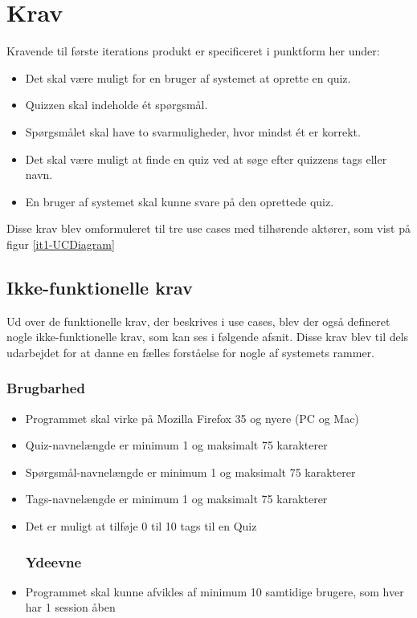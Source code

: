 \section{Krav}
Kravende til første iterations produkt er specificeret i punktform her under:

\begin{itemize}
	\item Det skal være muligt for en bruger af systemet at oprette en quiz.
	\item Quizzen skal indeholde ét spørgsmål.
	\item Spørgsmålet skal have to svarmuligheder, hvor mindst ét er korrekt.
	\item Det skal være muligt at finde en quiz ved at søge efter quizzens tags eller navn.
	\item En bruger af systemet skal kunne svare på den oprettede quiz.
\end{itemize}

Disse krav blev omformuleret til tre use cases med tilhørende aktører, som vist på figur \ref{it1-UCDiagram}


\subsection*{Ikke-funktionelle krav}
Ud over de funktionelle krav, der beskrives i use cases, blev der også defineret nogle ikke-funktionelle krav, som kan ses i følgende afsnit. Disse krav blev til dels udarbejdet for at danne en fælles forståelse for nogle af systemets rammer.

\subsubsection*{Brugbarhed}
\begin{itemize}
	\item Programmet skal virke på Mozilla Firefox 35 og nyere (PC og Mac)
	\item Quiz-navnelængde er minimum 1 og maksimalt 75 karakterer
	\item Spørgsmål-navnelængde er minimum 1 og maksimalt 75 karakterer
	\item Tags-navnelængde er minimum 1 og maksimalt 75 karakterer
	\item Det er muligt at tilføje 0 til 10 tags til en Quiz

\subsubsection*{Ydeevne}
	\item Programmet skal kunne afvikles af minimum 10 samtidige brugere, som hver har 1 session åben

\end{itemize}